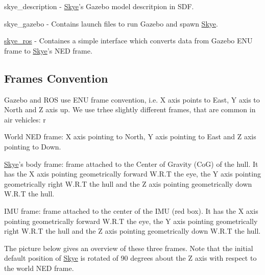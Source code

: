 {\ttfamily 
\begin{DoxyItemize}
\item skye\-\_\-description -\/ \hyperlink{class_skye}{Skye}'s Gazebo model descritpion in S\-D\-F.
\item skye\-\_\-gazebo -\/ Contains launch files to run Gazebo and spawn \hyperlink{class_skye}{Skye}.
\item \hyperlink{namespaceskye__ros}{skye\-\_\-ros} -\/ Containes a simple interface which converts data from Gazebo E\-N\-U frame to \hyperlink{class_skye}{Skye}'s N\-E\-D frame.
\end{DoxyItemize}}

{\ttfamily \subsection*{Frames Convention}}

{\ttfamily  Gazebo and R\-O\-S use E\-N\-U frame convention, i.\-e. X axis points to East, Y axis to North and Z axis up. We use trhee slightly different frames, that are common in air vehicles\-: r}

{\ttfamily 
\begin{DoxyItemize}
\item World N\-E\-D frame\-: X axis pointing to North, Y axis pointing to East and Z axis pointing to Down.
\item \hyperlink{class_skye}{Skye}'s body frame\-: frame attached to the Center of Gravity (Co\-G) of the hull. It has the X axis pointing geometrically forward W.\-R.\-T the eye, the Y axis pointing geometrically right W.\-R.\-T the hull and the Z axis pointing geometrically down W.\-R.\-T the hull.
\item I\-M\-U frame\-: frame attached to the center of the I\-M\-U (red box). It has the X axis pointing geometrically forward W.\-R.\-T the eye, the Y axis pointing geometrically right W.\-R.\-T the hull and the Z axis pointing geometrically down W.\-R.\-T the hull.
\end{DoxyItemize}}

{\ttfamily The picture below gives an overview of these three frames. Note that the initial default position of \hyperlink{class_skye}{Skye} is rotated of 90 degrees about the Z axis with respect to the world N\-E\-D frame.}

{\ttfamily }

{\ttfamily   }

{\ttfamily  }